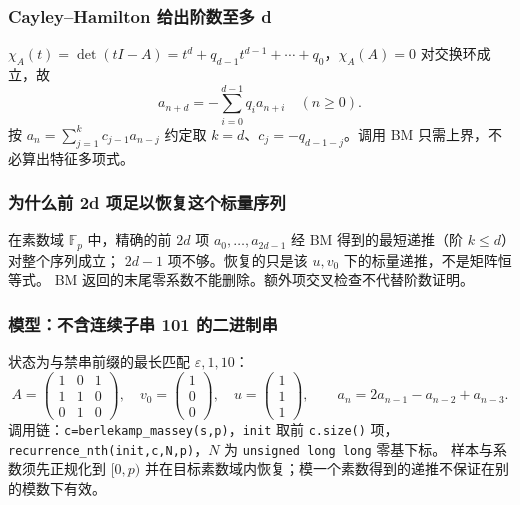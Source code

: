 \subsubsection{Cayley--Hamilton 给出阶数至多 d}
$\chi_A(t)=\det(tI-A)=t^d+q_{d-1}t^{d-1}+\cdots+q_0$，$\chi_A(A)=0$ 对交换环成立，故
\[
\boxed{a_{n+d}=-\sum_{i=0}^{d-1}q_i a_{n+i}\quad(n\ge0).}
\]
按 $a_n=\sum_{j=1}^k c_{j-1}a_{n-j}$ 约定取 $k=d$、$c_j=-q_{d-1-j}$。调用 BM 只需上界，不必算出特征多项式。

\subsubsection{为什么前 2d 项足以恢复这个标量序列}
在素数域 $\mathbb F_p$ 中，精确的前 $2d$ 项 $a_0,\ldots,a_{2d-1}$ 经 BM 得到的最短递推（阶 $k\le d$）对整个序列成立；
$2d-1$ 项不够。恢复的只是该 $u,v_0$ 下的标量递推，不是矩阵恒等式。
BM 返回的末尾零系数不能删除。额外项交叉检查不代替阶数证明。

\subsubsection{模型：不含连续子串 101 的二进制串}
状态为与禁串前缀的最长匹配 $\varepsilon,1,10$：
\[
A=\begin{pmatrix}1&0&1\\1&1&0\\0&1&0\end{pmatrix},\quad
v_0=\begin{pmatrix}1\\0\\0\end{pmatrix},\quad
u=\begin{pmatrix}1\\1\\1\end{pmatrix},\qquad
a_n=2a_{n-1}-a_{n-2}+a_{n-3}.
\]
调用链：\texttt{c=berlekamp\_massey(s,p)}，\texttt{init} 取前 \texttt{c.size()} 项，
\texttt{recurrence\_nth(init,c,N,p)}，$N$ 为 \texttt{unsigned long long} 零基下标。
样本与系数须先正规化到 $[0,p)$ 并在目标素数域内恢复；模一个素数得到的递推不保证在别的模数下有效。

